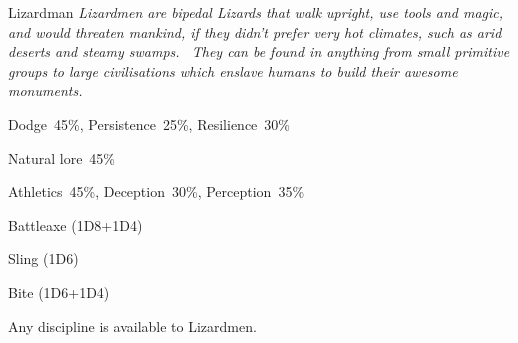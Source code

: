 \begin{monsterbox}{Lizardman}
	\textit{Lizardmen are bipedal Lizards that walk upright, use tools and magic, and would threaten mankind, if they didn’t prefer very hot climates, such as arid deserts and steamy swamps.  They can be found in anything from small primitive groups to large civilisations which enslave humans to build their awesome monuments.}\\
	\rpghline
	\basics[%
  hitpoints  = 11,
	majorwound = 6,
	damagemodifier = +1D4,
	powerpoints = 11,
	movementrate = 15m,
	armor = Scales (2AP),
	plunderrating = 3
	]
	\rpghline%
	\stats[ %
		STR = 3D6+6 (17),
		CON = 3D6   (11),
		DEX = 2D6+3 (10),
		SIZ = 3D6   (11),
		INT = 2D6+6 (13),
		POW = 3D6   (11),
		CHA = 2D6   (7)
	]
	\rpghline%
	\begin{rpg-monsteraction}[Resistances]
		Dodge~45\%, Persistence~25\%, Resilience~30\%
	\end{rpg-monsteraction}
	\begin{rpg-monsteraction}[Knowledge]
    		Natural lore~45\%
	\end{rpg-monsteraction}
	\begin{rpg-monsteraction}[Practical]
		Athletics~45\%, Deception~30\%, Perception~35\%
	\end{rpg-monsteraction}
	\begin{rpg-monsteraction}
		Battleaxe (1D8+1D4)
	\end{rpg-monsteraction}
	\begin{rpg-monsteraction}
		Sling (1D6)
	\end{rpg-monsteraction}
	\begin{rpg-monsteraction}
		Bite (1D6+1D4)
	\end{rpg-monsteraction}
	\begin{rpg-monsteraction}[Supernatural]
		Any discipline is available to Lizardmen.
	\end{rpg-monsteraction}

\end{monsterbox}


